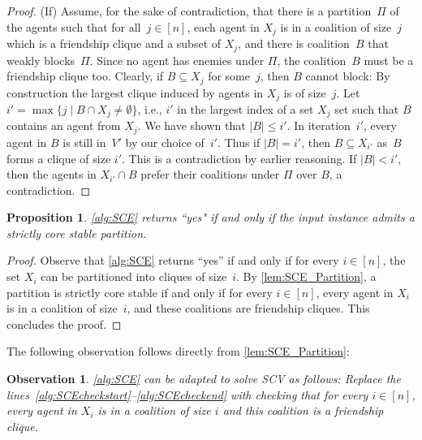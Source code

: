 \documentclass[a4paper,fleqn]{cas-sc}
\newcommand{\agent}{agent\xspace}
\newcommand{\agents}{agents\xspace}
\newcommand{\agentSetInMaxCoalition}{\ensuremath{X}\xspace}
\newcommand{\partition}{\ensuremath{\Pi}\xspace}
\newcommand{\blockingCoalition}{\ensuremath{B}\xspace}
\newcommand{\SCV}{SCV\xspace}
\newtheorem{proposition}{Proposition}
\newtheorem{obs}{Observation}
\newcommand{\fcliq}{friendship clique\xspace}
\newcommand{\fcliqs}{friendship cliques\xspace}
\begin{document}
\begin{proof}
    (If) Assume, for the sake of contradiction, that there is a partition~$\partition$ of the \agents such that for all~$j \in [n]$, each agent in $\agentSetInMaxCoalition_j$ is in a coalition of size~$j$ which is a \fcliq and a subset of $\agentSetInMaxCoalition_j$, and there is coalition~$\blockingCoalition$ that weakly blocks~\partition.
    Since no agent has enemies under \partition, the coalition~\blockingCoalition must be a \fcliq too.
    Clearly, if $\blockingCoalition \subseteq \agentSetInMaxCoalition_j$ for some~$j$, then $\blockingCoalition$ cannot block: By construction the largest clique induced by agents in $\agentSetInMaxCoalition_j$ is of size~$j$.
    Let $i'= \max\{j \mid \blockingCoalition \cap \agentSetInMaxCoalition_j \neq \emptyset\}$, i.e., $i'$ in the largest index of a set $\agentSetInMaxCoalition_j$ set such that \blockingCoalition contains an \agent from $\agentSetInMaxCoalition_j$.     We have shown that $|\blockingCoalition| \leq i'$. 
    In iteration~$i'$, every \agent in $\blockingCoalition$ is still in~$V'$ by our choice of~$i'$. Thus if $|\blockingCoalition| = i'$, then $\blockingCoalition \subseteq \agentSetInMaxCoalition_{i'}$ as~$\blockingCoalition$ forms a clique of size $i'$. This is a contradiction by earlier reasoning.
    If $|\blockingCoalition| < i'$, then the \agents in $\agentSetInMaxCoalition_{i'} \cap \blockingCoalition$ prefer their coalitions under \partition over \blockingCoalition, a contradiction.
       \end{proof}

\begin{proposition}
    \cref{alg:SCE} returns ``yes" if and only if the input instance admits a strictly core stable partition.
    \label{prop:correctness_alg_SCE}
\end{proposition}

\begin{proof}
Observe that \cref{alg:SCE} returns ``yes'' if and only if for every $i \in [n]$, the set $\agentSetInMaxCoalition_i$ can be partitioned into cliques of size~$i$. By \cref{lem:SCE_Partition}, a partition is strictly core stable if and only if for every $i \in [n]$, every agent in $\agentSetInMaxCoalition_i$ is in a coalition of size~$i$, and these coalitions are \fcliqs. This concludes the proof.
\end{proof}


The following observation follows directly from \cref{lem:SCE_Partition}:
\begin{obs}
\cref{alg:SCE} can be adapted to solve \SCV as follows:
Replace the lines~\ref{alg:SCEcheckstart}--\ref{alg:SCEcheckend} with checking that for every $i \in [n]$, every agent in $\agentSetInMaxCoalition_i$ is in a coalition of size $i$ and this coalition is a \fcliq. 
    \label{obs:alg_SCE_to_SCV}
\end{obs}
\end{document}
